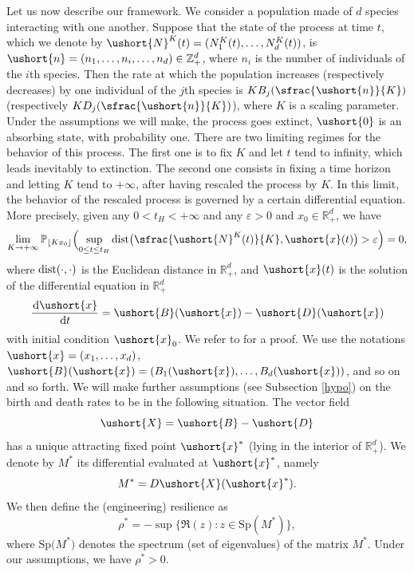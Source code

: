 \documentclass[JEP,XML,SOM,Unicode]{cedram}
\numberwithin{equation}{section}
\theoremstyle{plain}
\theoremstyle{definition}
\newcommand{\proba}{{\mathbb{P}}}
\newcommand{\zentiers}{{\mathbb{Z}}}
\newcommand{\domaine}{\zentiers_{+}^{d}}
\newcommand{\rpd}{\mathbb{R}_+^d}
\newcommand{\sK}{K}
\newcommand{\Sp}{\mathrm{Sp}}
\newcommand{\vecn}{\ushort{n}}
\newcommand{\vecxf}{\ushort{x}^*}
\newcommand{\vecx}{\ushort{x}}
\newcommand{\vecX}{\ushort{X}}
\newcommand{\vecB}{\ushort{B}}
\newcommand{\vecD}{\ushort{D}}
\newcommand{\veczer}{\ushort{0}}
\newcommand{\res}{\rho^*}
\newcommand{\leproc}{\ushort{N}^{K}}
\newcommand{\dd}{\hspace{1pt}\mathrm{d}}
\begin{document}
Let us now describe our framework. We consider a population made of $d$ species interacting with one another. Suppose that the state of the
process at time $t$, which we denote by $\leproc(t)=(N_1^{\sK}(t), \ldots,N_d^{\sK}(t))$, is $\vecn=(n_1,
\ldots,n_i,\ldots,n_d) \in\domaine$, where $n_i$ is the number of individuals of the $i$th species. Then the rate at which the population increases
(respectively decreases) by one individual of the $j$th species is $KB_j(\sfrac{\vecn}{K})$ (respectively $K
D_j(\sfrac{\vecn}{K})$), where $K$ is a scaling parameter.
Under the assumptions we will make, the process goes extinct, \ie $\veczer$ is an absorbing state, with probability one.
There are two limiting regimes for the behavior of this process.
The first one is to fix $K$ and let $t$ tend to infinity, which leads inevitably to extinction.
The second one consists in fixing a time horizon and letting $K$ tend to $+\infty$, after having rescaled the process
by $K$. In this limit, the behavior of the rescaled process is governed by a certain differential equation.
More precisely, given any $0<t_H<+\infty$ and any $\varepsilon>0$ and $x_{0}\in \rpd$, we have
\[
\lim_{K\to+\infty} \proba_{\lfloor \sK x_{0}\rfloor}
\Bigl(\sup_{0\leq t\leq t_H}\textup{dist}\bigl(\sfrac{\leproc(t)}{K},\vecx(t)\bigr)>\varepsilon \Bigr)=0,
\]
where $\textup{dist}(\cdot,\cdot)$ is the Euclidean distance in $\rpd$, and $\vecx(t)$ is the solution of the differential equation in $\rpd$
\[
\frac{\dd\vecx}{\dd t}=\vecB(\vecx)-\vecD(\vecx)
\]
with initial condition $\vecx_0$. We refer to \cite[Chap.\,11]{EK} for a proof.
We use the notations $\vecx=(x_1,\ldots,x_d)$, $\vecB(\vecx)=(B_1(\vecx),\ldots,B_d(\vecx))$,
and so on and so forth. We will make further assumptions (see Subsection \ref{hypo}) on the birth and death rates to be in the following
situation.
The vector field
\[
\vecX=\vecB-\vecD
\]
has a unique attracting fixed point $\vecxf$ (lying in the interior of $\rpd$). We denote by $M^*$ its differential evaluated at
$\vecxf$, namely
\[
M^*=D\vecX(\vecxf).
\]
We then define the (engineering) resilience as
\[
\res= - \sup\{ \Re (z): z\in\Sp(M^*)\},
\]
where $\Sp\bigl(M^*\bigr)$ denotes the spectrum (set of eigenvalues) of the matrix $M^*$.
Under our assumptions, we have $\res>0$.
\end{document}
